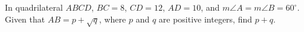 In quadrilateral $ABCD$, $BC=8$, $CD=12$, $AD=10$, and $m\angle A= m\angle B = 60^\circ$. Given that $AB=p + \sqrt{q}$, where $p$ and $q$ are positive integers, find $p+q$.